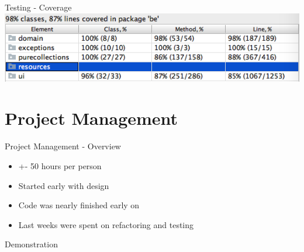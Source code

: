 \documentclass[10pt]{beamer}
\begin{document}
\begin{frame}[fragile]{Testing - Coverage}
\includegraphics[width=1\textwidth]{coverage}
\end{frame}

\section{Project Management}
%

\begin{frame}[fragile]{Project Management - Overview}
\begin{itemize}
\item +- 50 hours per person
\item Started early with design
\item Code was nearly finished early on
\item Last weeks were spent on refactoring and testing
\end{itemize}
\end{frame}

{
\begin{frame}[standout]
  Demonstration
\end{frame}
}
\end{document}

